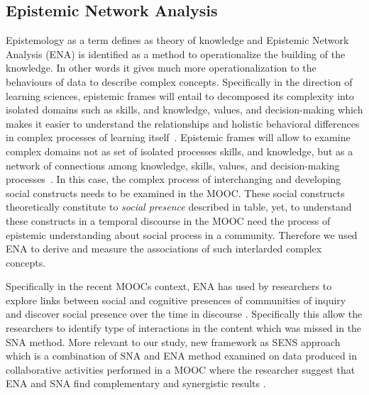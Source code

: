 \documentclass[manuscript,screen,review]{acmart}
\begin{document}
\subsection{Epistemic Network Analysis}
Epistemology as a term defines as theory of knowledge and Epistemic Network Analysis (ENA) is identified as a method to operationalize the building of the knowledge. In other words it gives much more operationalization to the behaviours of data to describe complex concepts. Specifically in the direction of learning sciences, epistemic frames will entail to decomposed its complexity into isolated domains such as skills, and knowledge, values, and decision-making which makes it easier to understand the relationships and holistic behavioral differences in complex processes of learning itself~\cite{shaffer2017quantitative}. Epistemic frames will allow to examine complex domains not as set of isolated processes skills, and knowledge, but as a network of
connections among knowledge, skills, values, and decision-making processes~\cite{shaffer2009epistemic,rupp2010evidence}. In this case, the complex process of interchanging and developing social constructs needs to be examined in the MOOC. These social constructs theoretically constitute to \textit{social presence} described in table, yet, to understand these constructs in a temporal discourse in the MOOC need the process of epistemic understanding about social process in a community. Therefore we used ENA to derive and measure the associations of such interlarded complex concepts.

Specifically in the recent MOOCs context, ENA has used by researchers to explore links between social and cognitive presences of communities of inquiry and discover social presence over the time in discourse \cite{rolim2019network}. Specifically this allow the researchers to identify type of interactions in the content which was missed in the SNA method. More relevant to our study,  new framework as SENS approach which is a combination of SNA and ENA method examined on data produced in collaborative activities performed in a MOOC where the researcher suggest that ENA and SNA find complementary and synergistic results \cite{gavsevic2019sens}. 
\end{document}

